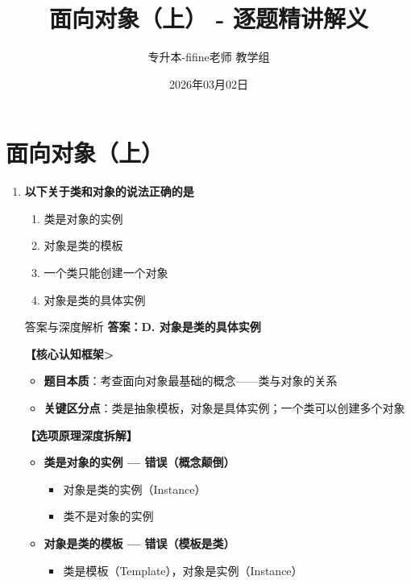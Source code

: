 \documentclass[12pt, a4paper]{ctexart}
\title{\textcolor{myblue}{\textbf{面向对象（上） - 逐题精讲解义}}}
\author{专升本-fifine老师 教学组}
\date{2026年03月02日}
\begin{document}
\maketitle
\thispagestyle{empty}
\newpage

\section{面向对象（上）}

\begin{enumerate}[label=\textbf{\arabic*.}]

	\item \textbf{以下关于类和对象的说法正确的是}
	      \begin{enumerate}[label=\Alph*.]
		      \item 类是对象的实例
		      \item 对象是类的模板
		      \item 一个类只能创建一个对象
		      \item 对象是类的具体实例
	      \end{enumerate}

	      \begin{bluebox}{答案与深度解析}
		      \textbf{答案：D. 对象是类的具体实例}

		      \textbf{【核心认知框架>}
		      \begin{itemize}[label={}, leftmargin=*, nosep]
			      \item \textbf{题目本质}：考查面向对象最基础的概念——类与对象的关系
			      \item \textbf{关键区分点}：类是抽象模板，对象是具体实例；一个类可以创建多个对象
		      \end{itemize}

		      \textbf{【选项原理深度拆解】}
		      \begin{itemize}[label={}, nosep]

		      \item \textbf{类是对象的实例 — 错误（概念颠倒）}
		      \begin{itemize}[label={}, nosep]
			      \item 对象是类的实例（Instance）
			      \item 类不是对象的实例
		      \end{itemize}

		      \item \textbf{对象是类的模板 — 错误（模板是类）}
		      \begin{itemize}[label={}, nosep]
			      \item 类是模板（Template），对象是实例（Instance）
		      \end{itemize}


\end{itemize}
\end{bluebox}
\end{enumerate}
\end{document}
